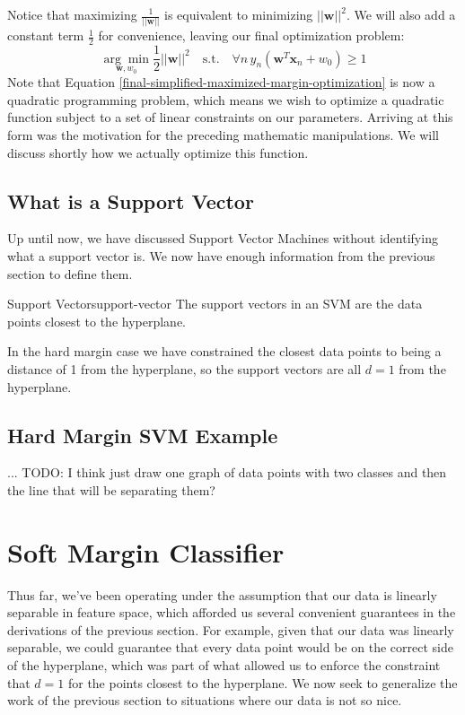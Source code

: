 Notice that maximizing $\frac{1}{||\textbf{w}||}$ is equivalent to minimizing $||\textbf{w}||^{2}$. We will also add a constant term $\frac{1}{2}$ for convenience, leaving our final optimization problem:
\begin{equation} \label{final-simplified-maximized-margin-optimization}
	\underset{\textbf{w}, w_{0}}{\arg\min} \frac{1}{2} ||\textbf{w}||^{2} \quad \text{s.t.} \quad \forall n \, y_{n}(\textbf{w}^{T}\textbf{x}_{n} + w_{0}) \geq 1
\end{equation}
Note that Equation \ref{final-simplified-maximized-margin-optimization} is now a quadratic programming problem, which means we wish to optimize a quadratic function subject to a set of linear constraints on our parameters. Arriving at this form was the motivation for the preceding mathematic manipulations. We will discuss shortly how we actually optimize this function.

\subsection{What is a Support Vector}
Up until now, we have discussed Support Vector Machines without identifying what a support vector is. We now have enough information from the previous section to define them.

\begin{definition}{Support Vector}{support-vector}
The support vectors in an SVM are the data points closest to the hyperplane.
\end{definition}

In the hard margin case we have constrained the closest data points to being a distance of 1 from the hyperplane, so the support vectors are all $d=1$ from the hyperplane.


\subsection{Hard Margin SVM Example}
... TODO: I think just draw one graph of data points with two classes and then the line that will be separating them?

\section{Soft Margin Classifier}
Thus far, we've been operating under the assumption that our data is linearly separable in feature space, which afforded us several convenient guarantees in the derivations of the previous section. For example, given that our data was linearly separable, we could guarantee that every data point would be on the correct side of the hyperplane, which was part of what allowed us to enforce the constraint that $d=1$ for the points closest to the hyperplane. We now seek to generalize the work of the previous section to situations where our data is not so nice.

